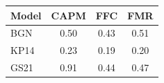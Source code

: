 \begin{tabular}{l c c c}
\toprule
Model & CAPM & FFC & FMR \\
\midrule
BGN & 0.50 & 0.43 & 0.51 \\
KP14 & 0.23 & 0.19 & 0.20 \\
GS21 & 0.91 & 0.44 & 0.47 \\
\bottomrule
\end{tabular}